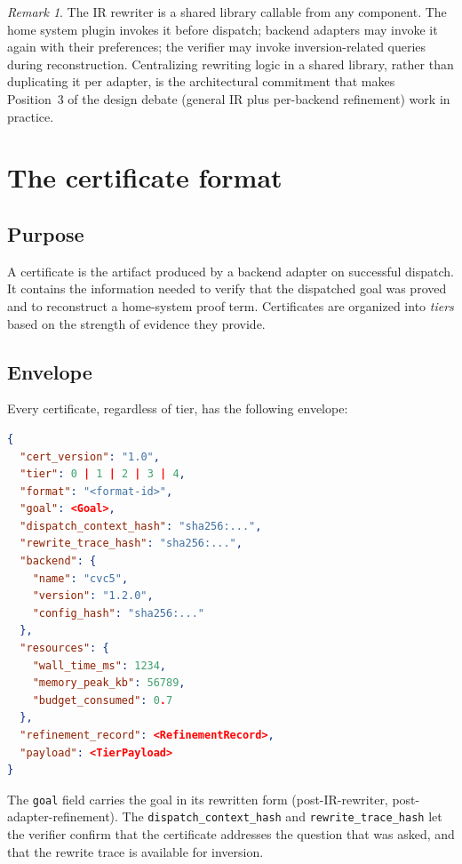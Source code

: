 \documentclass[11pt,letterpaper]{article}
\theoremstyle{definition}
\theoremstyle{remark}
\newtheorem*{remark}{Remark}
\begin{document}
\begin{remark}
The IR rewriter is a shared library callable from any component. The
home system plugin invokes it before dispatch; backend adapters may
invoke it again with their preferences; the verifier may invoke
inversion-related queries during reconstruction. Centralizing rewriting
logic in a shared library, rather than duplicating it per adapter, is
the architectural commitment that makes Position~3 of the design
debate (general IR plus per-backend refinement) work in practice.
\end{remark}

\section{The certificate format}
\label{sec:certificates}

\subsection{Purpose}

A certificate is the artifact produced by a backend adapter on
successful dispatch. It contains the information needed to verify that
the dispatched goal was proved and to reconstruct a home-system proof
term. Certificates are organized into \emph{tiers} based on the strength
of evidence they provide.

\subsection{Envelope}

Every certificate, regardless of tier, has the following envelope:

\begin{lstlisting}[language=json]
{
  "cert_version": "1.0",
  "tier": 0 | 1 | 2 | 3 | 4,
  "format": "<format-id>",
  "goal": <Goal>,
  "dispatch_context_hash": "sha256:...",
  "rewrite_trace_hash": "sha256:...",
  "backend": {
    "name": "cvc5",
    "version": "1.2.0",
    "config_hash": "sha256:..."
  },
  "resources": {
    "wall_time_ms": 1234,
    "memory_peak_kb": 56789,
    "budget_consumed": 0.7
  },
  "refinement_record": <RefinementRecord>,
  "payload": <TierPayload>
}
\end{lstlisting}

The \texttt{goal} field carries the goal in its rewritten form (post-IR-rewriter,
post-adapter-refinement). The \texttt{dispatch\_context\_hash} and
\texttt{rewrite\_trace\_hash} let the verifier confirm that the certificate
addresses the question that was asked, and that the rewrite trace is
available for inversion.
\end{document}
